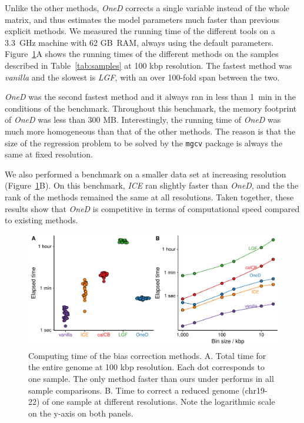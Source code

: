 \documentclass{article}
\begin{document}
Unlike the other methods, \textit{OneD} corrects a single variable instead
of the whole matrix, and thus estimates the model parameters much faster
than previous explicit methods. We measured the running time of the
different tools on a 3.3~GHz machine with 62 GB~RAM, always using the
default parameters. Figure~\ref{fig:times}A shows the running times of the
different methods on the samples described in Table~\ref{tab:samples} at
100 kbp resolution. The fastest method was \textit{vanilla} and the
slowest is \textit{LGF}, with an over 100-fold span between the two.

\textit{OneD} was the second fastest method and it always ran in less than
1~min in the conditions of the benchmark. Throughout this benchmark, the
memory footprint of \textit{OneD} was less than 300 MB.  Interestingly,
the running time of \textit{OneD} was much more homogeneous than that of
the other methods. The reason is that the size of the regression problem
to be solved by the \texttt{mgcv} package is always the same at fixed
resolution.

We also performed a benchmark on a smaller data set at increasing
resolution (Figure~\ref{fig:times}B). On this benchmark, \textit{ICE} ran
slightly faster than \textit{OneD}, and the the rank of the methods
remained the same at all resolutions. Taken together, these results show
that \textit{OneD} is competitive in terms of computational speed compared
to existing methods.

\begin{figure}
\centerline{\includegraphics[width=.99\textwidth]
  {img/figure_benchmark_time.pdf}}
\caption{
Computing time of the bias correction methods. A. Total time for the
entire genome at 100 kbp resolution. Each dot corresponds to one sample.
The only method faster than ours under performs in all sample comparisons.
B. Time to correct a reduced genome (chr19-22) of one sample at different
resolutions. Note the logarithmic scale on the y-axis on both panels.}
\label{fig:times}
\end{figure}
\end{document}
